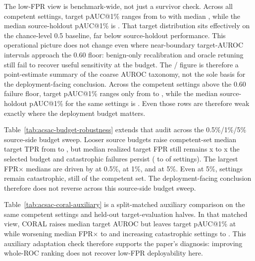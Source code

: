 \documentclass[10pt,conference]{IEEEtran}
\begin{document}
The low-FPR view is benchmark-wide, not just a survivor check. Across all \CompetentSettingCount{} competent settings, target pAUC@1\% ranges from \CompetentTargetPaucMin{} to \CompetentTargetPaucMax{} with median \CompetentTargetPaucMedian{}, while the median source-holdout pAUC@1\% is \CompetentSourcePaucMedian{}. That target distribution sits effectively on the chance-level 0.5 baseline, far below source-holdout performance. This operational picture does not change even where near-boundary target-AUROC intervals approach the 0.60 floor: benign-only recalibration and oracle retuning still fail to recover useful sensitivity at the \FrozenFprTarget{} budget. The \CompetentRankingFailureCount{}/\CompetentSettingCount{} figure is therefore a point-estimate summary of the coarse AUROC taxonomy, not the sole basis for the deployment-facing conclusion. Across the \CompetentNonCollapsedCount{} competent settings above the 0.60 failure floor, target pAUC@1\% ranges only from \CompetentNonCollapsedTargetPaucMin{} to \CompetentNonCollapsedTargetPaucMax{}, while the median source-holdout pAUC@1\% for the same settings is \CompetentNonCollapsedSourcePaucMedian{}. Even those rows are therefore weak exactly where the deployment budget matters.



Table~\ref{tab:acsac-budget-robustness} extends that audit across the 0.5\%/1\%/5\% source-side budget sweep. Looser source budgets raise competent-set median target TPR from \BudgetHalfPctCompetentMedianTargetTpr{} to \BudgetFivePctCompetentMedianTargetTpr{}, but median realized target FPR still remains \BudgetHalfPctCompetentMedianBudgetMultiple{}x to \BudgetFivePctCompetentMedianBudgetMultiple{}x the selected budget and catastrophic failures persist (\BudgetHalfPctCompetentCatastrophicCount{} to \BudgetFivePctCompetentCatastrophicCount{} of \CompetentSettingCount{} settings). The largest FPR$\times$ medians are driven by \BudgetHalfPctCompetentDominantFprxDirection{} at 0.5\%, \BudgetOnePctCompetentDominantFprxDirection{} at 1\%, and \BudgetFivePctCompetentDominantFprxDirections{} at 5\%. Even at 5\%, \BudgetFivePctCompetentCatastrophicCount{} settings remain catastrophic, still \BudgetFivePctCompetentCatastrophicShare{} of the competent set. The deployment-facing conclusion therefore does not reverse across this source-side budget sweep.



Table~\ref{tab:acsac-coral-auxiliary} is a split-matched auxiliary comparison on the same \CompetentSettingCount{} competent settings and held-out target-evaluation halves. In that matched view, CORAL raises median target AUROC but leaves target pAUC@1\% at \CoralCompetentMedianTargetPauc{} while worsening median FPR$\times$ to \CoralCompetentMedianBudgetMultiple{} and increasing catastrophic settings to \CoralCompetentCatastrophicCount{}. This auxiliary adaptation check therefore supports the paper's diagnosis: improving whole-ROC ranking does not recover low-FPR deployability here.
\end{document}

